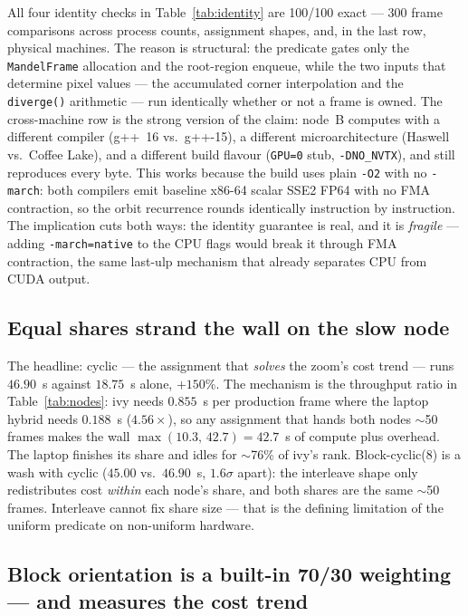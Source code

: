 \documentclass[
	english,
	letterpaper, oneside
]{article}
\begin{document}
All four identity checks in Table~\ref{tab:identity} are 100/100 exact ---
300 frame comparisons across process counts, assignment shapes, and, in the
last row, physical machines. The reason is structural: the predicate gates
only the \texttt{MandelFrame} allocation and the root-region enqueue, while
the two inputs that determine pixel values --- the accumulated corner
interpolation and the \texttt{diverge()} arithmetic --- run identically
whether or not a frame is owned. The cross-machine row is the strong
version of the claim: node~B computes with a different compiler (g++~16
vs.\ g++-15), a different microarchitecture (Haswell vs.\ Coffee Lake), and
a different build flavour (\texttt{GPU=0} stub, \texttt{-DNO\_NVTX}), and
still reproduces every byte. This works because the build uses plain
\texttt{-O2} with no \texttt{-march}: both compilers emit baseline x86-64
scalar SSE2 FP64 with no FMA contraction, so the orbit recurrence rounds
identically instruction by instruction. The implication cuts both ways:
the identity guarantee is real, and it is \emph{fragile} --- adding
\texttt{-march=native} to the CPU flags would break it through FMA
contraction, the same last-ulp mechanism that already separates CPU from
CUDA output.

\subsection{Equal shares strand the wall on the slow node}
\label{sec:equal-share}

The headline: cyclic --- the assignment that \emph{solves} the zoom's cost
trend --- runs $46.90$~s against $18.75$~s alone, $+150\%$. The mechanism is
the throughput ratio in Table~\ref{tab:nodes}: ivy needs $0.855$~s per
production frame where the laptop hybrid needs $0.188$~s ($4.56\times$), so
any assignment that hands both nodes $\sim$50 frames makes the wall
$\max(10.3,\,42.7) = 42.7$~s of compute plus overhead. The laptop finishes
its share and idles for $\sim$76\% of ivy's rank. Block-cyclic(8) is a wash
with cyclic ($45.00$ vs.\ $46.90$~s, $1.6\sigma$ apart): the interleave
shape only redistributes cost \emph{within} each node's share, and both
shares are the same $\sim$50 frames. Interleave cannot fix share size ---
that is the defining limitation of the uniform predicate on non-uniform
hardware.

\subsection{Block orientation is a built-in 70/30 weighting --- and measures the cost trend}
\label{sec:block}
\end{document}
